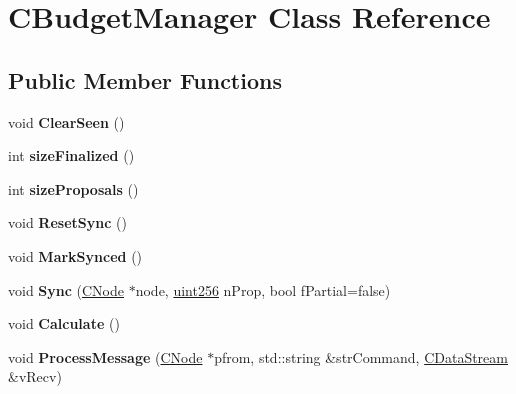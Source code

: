 \hypertarget{class_c_budget_manager}{}\section{C\+Budget\+Manager Class Reference}
\label{class_c_budget_manager}
\subsection*{Public Member Functions}
\begin{DoxyCompactItemize}
\item 
\mbox{\label{class_c_budget_manager_a21781707dcbe751e196abc105b51a669}} 
void {\bfseries Clear\+Seen} ()
\item 
\mbox{\label{class_c_budget_manager_ad5cbfb683ac7357fae4a68a7f3b665d9}} 
int {\bfseries size\+Finalized} ()
\item 
\mbox{\label{class_c_budget_manager_a609ccf2a42e5143ddcc6c5d52a9a8afb}} 
int {\bfseries size\+Proposals} ()
\item 
\mbox{\label{class_c_budget_manager_ac890f5fcc4bb9ec568675d602595d384}} 
void {\bfseries Reset\+Sync} ()
\item 
\mbox{\label{class_c_budget_manager_a4734e3b02666531b008329e84391757d}} 
void {\bfseries Mark\+Synced} ()
\item 
\mbox{\label{class_c_budget_manager_ab24ec088c09d18c03ae539f2bbe19743}} 
void {\bfseries Sync} (\mbox{\hyperlink{class_c_node}{C\+Node}} $\ast$node, \mbox{\hyperlink{classuint256}{uint256}} n\+Prop, bool f\+Partial=false)
\item 
\mbox{\label{class_c_budget_manager_af7a17ebc57f1dd5259e813f5a5149a0d}} 
void {\bfseries Calculate} ()
\item 
\mbox{\label{class_c_budget_manager_a3fc235d528e37ec1c66789f3bfed1878}} 
void {\bfseries Process\+Message} (\mbox{\hyperlink{class_c_node}{C\+Node}} $\ast$pfrom, std\+::string \&str\+Command, \mbox{\hyperlink{class_c_data_stream}{C\+Data\+Stream}} \&v\+Recv)

\end{DoxyCompactItemize}
